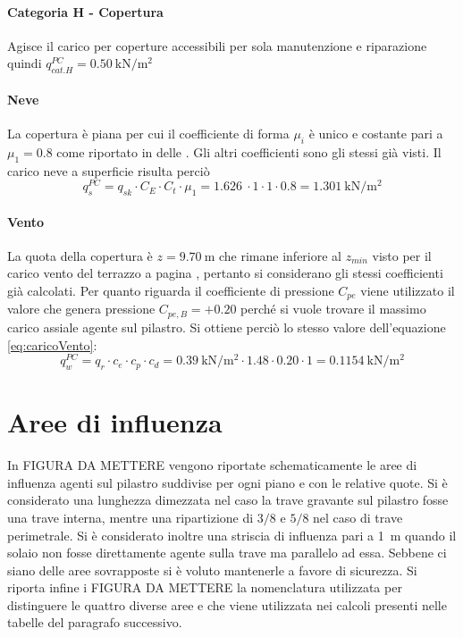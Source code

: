 \paragraph*{Categoria H - Copertura} Agisce il carico per coperture accessibili per sola manutenzione e riparazione quindi $q_{cat. H}^{PC} = \SI{0.50}{\kilo\newton\per\square\meter}$ 
\paragraph*{Neve} La copertura è piana per cui il coefficiente di forma $\mu_i$ è unico e costante pari a $\mu_1=0.8$ come riportato in  delle . 
Gli altri coefficienti sono gli stessi già visti.
Il carico neve a superficie risulta perciò
\[
	q_s^{PC} = q_{sk} \cdot C_E \cdot C_t \cdot \mu_1 = \SI{1.626}{} \cdot 1 \cdot 1 \cdot 0.8 = \SI{1.301}{\kilo\newton\per\square\meter}
\]
\paragraph*{Vento} La quota della copertura è $z=\SI{9.70}{\meter}$ che rimane inferiore al $z_{min}$ visto per il carico vento del terrazzo a pagina \pageref{cap:ventoTerrazzo}, pertanto si considerano gli stessi coefficienti già calcolati.
Per quanto riguarda il coefficiente di pressione $C_{pe}$ viene utilizzato il valore che genera pressione $C_{pe,B}=+0.20$ perché si vuole trovare il massimo carico assiale agente sul pilastro.
Si ottiene perciò lo stesso valore dell'equazione \eqref{eq:caricoVento}:
\[
	q_w^{PC} = q_r \cdot c_e \cdot c_p \cdot c_d = \SI{0.39}{\kilo\newton\per\square\meter}\cdot 1.48 \cdot  0.20 \cdot 1= \SI{0.1154}{\kilo\newton\per\square\meter}
\]
\section{Aree di influenza}
In FIGURA DA METTERE vengono riportate schematicamente le aree di influenza agenti sul pilastro suddivise per ogni piano e con le relative quote. 
Si è considerato una lunghezza dimezzata nel caso la trave gravante sul pilastro fosse una trave interna, mentre una ripartizione di $3/8$ e $5/8$ nel caso di trave perimetrale. 
Si è considerato inoltre una striscia di influenza pari a \SI{1}{\meter} quando il solaio non fosse direttamente agente sulla trave ma parallelo ad essa. 
Sebbene ci siano delle aree sovrapposte si è voluto mantenerle a favore di sicurezza.
Si riporta infine i FIGURA DA METTERE la nomenclatura utilizzata per distinguere le quattro diverse aree e che viene utilizzata nei calcoli presenti nelle tabelle del paragrafo successivo.

